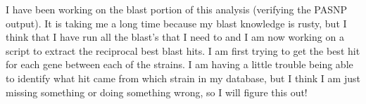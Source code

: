 \documentclass[12pt]{article}
\newcommand{\smel}{\textit{S.\,meliloti}\xspace}
\newcommand{\strep}{\textit{Streptomyces}\xspace}
\newcommand{\bass}{\textit{B.\,subtilis}\xspace}
\newcommand{\ecol}{\textit{E.\,coli}\xspace}
\providecommand{\e}[1]{\ensuremath{\times 10^{#1}}}
\begin{document}
I have been working on the blast portion of this analysis (verifying the PASNP output).
It is taking me a long time because my blast knowledge is rusty, but I think that I have run all the blast's that I need to and I am now working on a script to extract the reciprocal best blast hits.
I am first trying to get the best hit for each gene between each of the strains.
I am having a little trouble being able to identify what hit came from which strain in my database, but I think I am just missing something or doing something wrong, so I will figure this out!


%
%		
\end{document}
